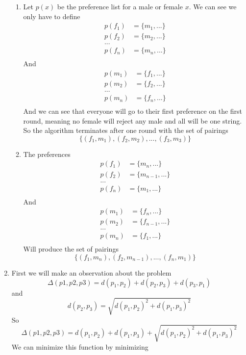 \documentclass[11pt]{article}
\begin{document}
\begin{enumerate}
		\begin{enumerate}
		\item Let $p(x)$ be the preference list for a
			male or female $x$. We can see we only have to
			define
			\begin{align*}
				p(f_1) &= \{ m_1, ... \} \\
				p(f_2) &= \{ m_2, ... \} \\
				... \\
				p(f_n) &= \{ m_n, ... \} \\
			\end{align*}
			And
			\begin{align*}
				p(m_1) &= \{ f_1, ... \} \\
				p(m_2) &= \{ f_2, ... \} \\
				... \\
				p(m_n) &= \{ f_n, ... \} \\
			\end{align*}
		And we can see that everyone will go to their first
			preference on the first round, meaning no female
			will reject any male and all will be one string.
			So the algorithm terminates after one round with
			the set of pairings
			$$\{(f_1,m_1),(f_2,m_2),...,(f_3,m_3)\}$$
		\item The preferences
			\begin{align*}
				p(f_1) &= \{ m_n, ... \} \\
				p(f_2) &= \{ m_{n-1}, ... \} \\
				... \\
				p(f_n) &= \{ m_1, ... \} \\
			\end{align*}
			And
			\begin{align*}
				p(m_1) &= \{ f_n, ... \} \\
				p(m_2) &= \{ f_{n-1}, ... \} \\
				... \\
				p(m_n) &= \{ f_1, ... \} \\
			\end{align*}
			Will produce the set of pairings
				$$\{(f_1,m_n),(f_2,m_{n-1}),...,(f_n,m_1)\}$$
		\end{enumerate}
	\item First we will make an observation about the problem
		$$\Delta(p1, p2, p3) = d(p_1,p_2) + d(p_2,p_3) + d(p_3,p_1)$$
		and 
		$$d(p_2,p_3) = \sqrt{d(p_1,p_2)^2 + d(p_1,p_3)^2}  $$
		So
		$$\Delta(p1, p2, p3) = d(p_1,p_2) + d(p_1,p_3) +
		\sqrt{d(p_1,p_2)^2 + d(p_1,p_3)^2} $$
		We can minimize this function by minimizing 

\end{enumerate}
\end{document}
